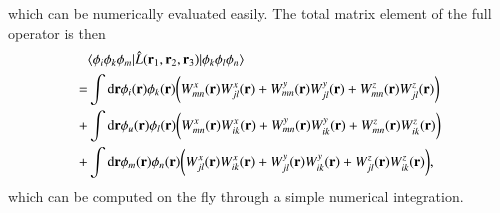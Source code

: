 \documentclass[aip,jcp,reprint,noshowkeys,superscriptaddress]{revtex4-1}
\newcommand{\matelem}[3]{\langle #1 | #2 | #3 \rangle}
\newcommand{\bri}[1]{{\bf r}_{#1}}
\begin{document}
which can be numerically evaluated easily. 
The total matrix element of the full operator is then 
\begin{equation}
 \label{eq:l_ijmkln_final}
 \begin{aligned}
 & \matelem{\phi_i \phi_k \phi_m}{\hat{L}(\bri{1},\bri{2},\bri{3})}{\phi_k \phi_l \phi_n} \\
 = & \int \text{d}{\bf r} \phi_i({\bf r})  \phi_k({\bf r}) \bigg( W_{mn}^x({\bf r}) W_{jl}^x({\bf r}) + W_{mn}^y({\bf r}) W_{jl}^y({\bf r}) + W_{mn}^z({\bf r}) W_{jl}^z({\bf r})\bigg) \\
 + & \int \text{d}{\bf r}\phi_u({\bf r})  \phi_l({\bf r}) \bigg( W_{mn}^x({\bf r}) W_{ik}^x({\bf r}) + W_{mn}^y({\bf r}) W_{ik}^y({\bf r}) + W_{mn}^z({\bf r}) W_{ik}^z({\bf r})\bigg) \\
 + & \int \text{d}{\bf r} \phi_m({\bf r})  \phi_n({\bf r}) \bigg( W_{jl}^x({\bf r}) W_{ik}^x({\bf r}) + W_{jl}^y({\bf r}) W_{ik}^y({\bf r}) + W_{jl}^z({\bf r}) W_{ik}^z({\bf r})\bigg), 
 \end{aligned}
\end{equation}
which can be computed on the fly through a simple numerical integration. 
\end{document}
